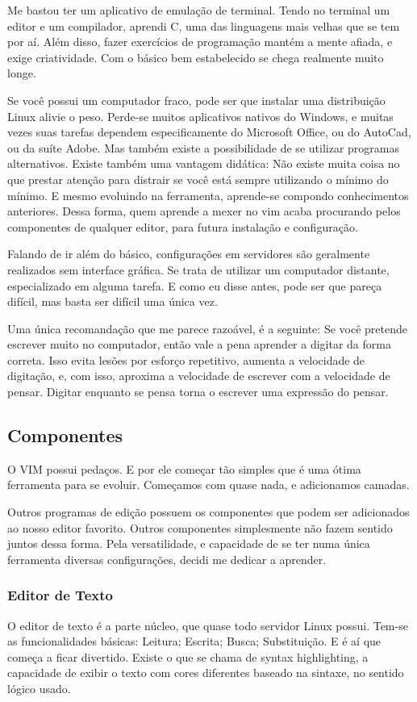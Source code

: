 Me bastou ter um aplicativo de emulação de terminal.
Tendo no terminal um editor e um compilador, aprendi C, uma das linguagens mais velhas que se tem por aí.
Além disso, fazer exercícios de programação mantém a mente afiada, e exige criatividade.
Com o básico bem estabelecido se chega realmente muito longe.

Se você possui um computador fraco, pode ser que instalar uma distribuição Linux alivie o peso.
Perde-se muitos aplicativos nativos do Windows, e muitas vezes suas tarefas dependem especificamente do Microsoft Office, ou do AutoCad, ou da suíte Adobe.
Mas também existe a possibilidade de se utilizar programas alternativos.
Existe também uma vantagem didática:
Não existe muita coisa no que prestar atenção para distrair se você está sempre utilizando o mínimo do mínimo.
E mesmo evoluindo na ferramenta, aprende-se compondo conhecimentos anteriores.
Dessa forma, quem aprende a mexer no vim acaba procurando pelos componentes de qualquer editor, para futura instalação e configuração.

Falando de ir além do básico, configurações em servidores são geralmente realizados sem interface gráfica.
Se trata de utilizar um computador distante, especializado em alguma tarefa.
E como eu disse antes, pode ser que pareça difícil, mas basta ser difícil uma única vez.

Uma única recomandação que me parece razoável, é a seguinte: Se você pretende escrever muito no computador, então vale a pena
aprender a digitar da forma correta.
Isso evita lesões por esforço repetitivo, aumenta a velocidade de digitação,
e, com isso, aproxima a velocidade de escrever com a velocidade de pensar.
Digitar enquanto se pensa torna o escrever uma expressão do pensar.

\subsection{Componentes}
O VIM possui pedaços.
E por ele começar tão simples que é uma ótima ferramenta para se evoluir.
Começamos com quase nada, e adicionamos camadas.

Outros programas de edição possuem os componentes que podem ser adicionados ao nosso editor favorito.
Outros componentes simplesmente não fazem sentido juntos dessa forma.
Pela versatilidade, e capacidade de se ter numa única ferramenta diversas configurações, decidi me dedicar a aprender.

\subsubsection{Editor de Texto}
O editor de texto é a parte núcleo, que quase todo servidor Linux possui.
Tem-se as funcionalidades básicas: Leitura; Escrita; Busca; Substituição.
E é aí que começa a ficar divertido.
Existe o que se chama de syntax highlighting, a capacidade de exibir o texto
com cores diferentes baseado na sintaxe, no sentido lógico usado.

